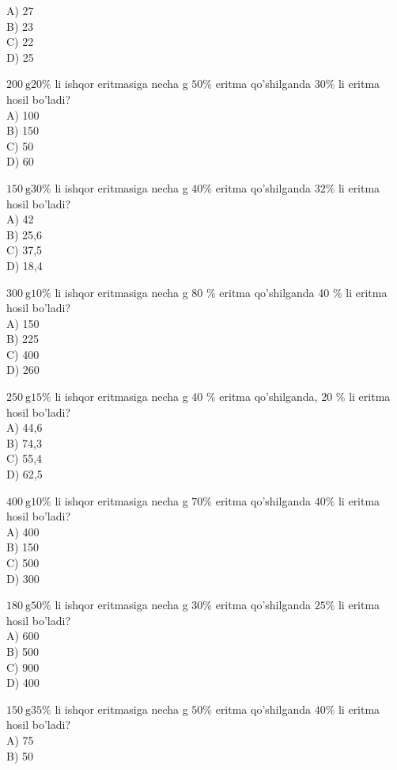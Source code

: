 A) 27\\
B) 23\\
C) 22\\
D) 25
  \item $200 \mathrm{~g} 20 \%$ li ishqor eritmasiga necha g $50 \%$ eritma qo'shilganda $30 \%$ li eritma hosil bo'ladi?\\
A) 100\\
B) 150\\
C) 50\\
D) 60\\
  \item $150 \mathrm{~g} 30 \%$ li ishqor eritmasiga necha g $40 \%$ eritma qo'shilganda $32 \%$ li eritma hosil bo'ladi?\\
A) 42\\
B) 25,6\\
C) 37,5\\
D) 18,4
  \item $300 \mathrm{~g} 10 \%$ li ishqor eritmasiga necha g 80 \% eritma qo'shilganda 40 \% li eritma hosil bo'ladi?\\
A) 150\\
B) 225\\
C) 400\\
D) 260
  \item $250 \mathrm{~g} 15 \%$ li ishqor eritmasiga necha g 40 \% eritma qo'shilganda, 20 \% li eritma hosil bo'ladi?\\
A) 44,6\\
B) 74,3\\
C) 55,4\\
D) 62,5
  \item $400 \mathrm{~g} 10 \%$ li ishqor eritmasiga necha g $70 \%$ eritma qo'shilganda $40 \%$ li eritma hosil bo'ladi?\\
A) 400\\
B) 150\\
C) 500\\
D) 300
  \item $180 \mathrm{~g} 50 \%$ li ishqor eritmasiga necha g $30 \%$ eritma qo'shilganda $25 \%$ li eritma hosil bo'ladi?\\
A) 600\\
B) 500\\
C) 900\\
D) 400
  \item $150 \mathrm{~g} 35 \%$ li ishqor eritmasiga necha g $50 \%$ eritma qo'shilganda $40 \%$ li eritma hosil bo'ladi?\\
A) 75\\
B) 50\\
